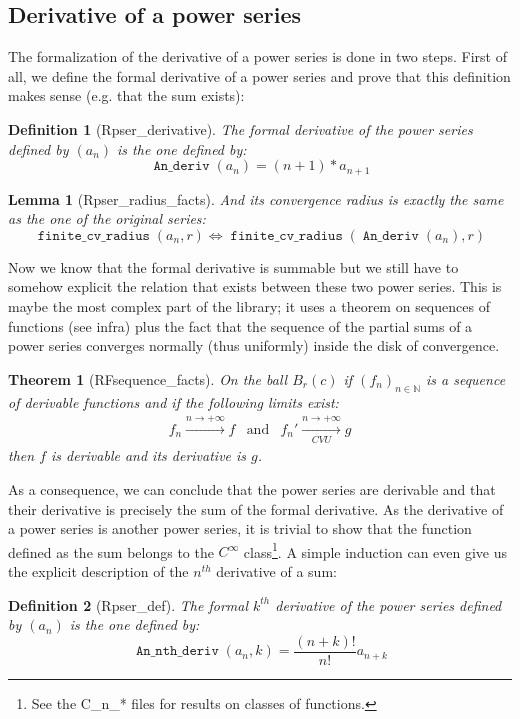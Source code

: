 \documentclass[submission,copyright]{eptcs}
\newcommand{\N}{\mathbb{N}}
\DeclareMathOperator{\D}{\mathtt{An\_deriv}}
\DeclareMathOperator{\Dn}{\mathtt{An\_nth\_deriv}}
\DeclareMathOperator{\fcvr}{\mathtt{finite\_cv\_radius}}
\newtheorem{definition}{Definition}
\newtheorem{lemma}{Lemma}
\newtheorem{theorem}{Theorem}
\begin{document}
\subsection{Derivative of a power series}

The formalization of the derivative of a power series is done in two steps.
First of all, we define the formal derivative of a power series and prove
that this definition makes sense (e.g. that the sum exists):

\begin{definition}[Rpser\_derivative] The formal derivative of the power
series defined by $(a_n)$ is the one defined by:
$$\D{}(a_n) = (n + 1) * a_{n+1}$$
\end{definition}

\begin{lemma}[Rpser\_radius\_facts] And its convergence radius is exactly
the same as the one of the original series: $$\fcvr{}(a_n,r) \Leftrightarrow
\fcvr{}(\D{}(a_n),r)$$\end{lemma}

Now we know that the formal derivative is summable but we still have to
somehow explicit the relation that exists between these two power series.
This is maybe the most complex part of the library; it uses a theorem on
sequences of functions (see infra) plus the fact that the sequence of
the partial sums of a power series converges normally (thus uniformly)
inside the disk of convergence.

\begin{theorem}[RFsequence\_facts] On the ball $B_r(c)$ if
$(f_n)_{n \in \N}$ is a sequence of derivable functions and if the
following limits exist: $$ \begin{array}{ccc}
f_n \xrightarrow{n \to +\infty} f & \text{and} &
f_n' \xrightarrow[CVU]{n \to +\infty} g\end{array}$$ then $f$ is
derivable and its derivative is $g$.\end{theorem}

As a consequence, we can conclude that the power series are derivable
and that their derivative is precisely the sum of the formal derivative.
As the derivative of a power series is another power series, it is
trivial to show that the function defined as the sum belongs to the
$C^{\infty}$ class\footnote{See the C\_n\_* files for results on
classes of functions.}. A simple induction can even give us the explicit
description of the $n^{th}$ derivative of a sum:

\begin{definition}[Rpser\_def] The formal $k^{th}$ derivative of the power
series defined by $(a_n)$ is the one defined by:
$$\Dn{}(a_n,k)  = \frac{(n + k)!}{n!} a_{n+k}$$
\end{definition}
\end{document}
